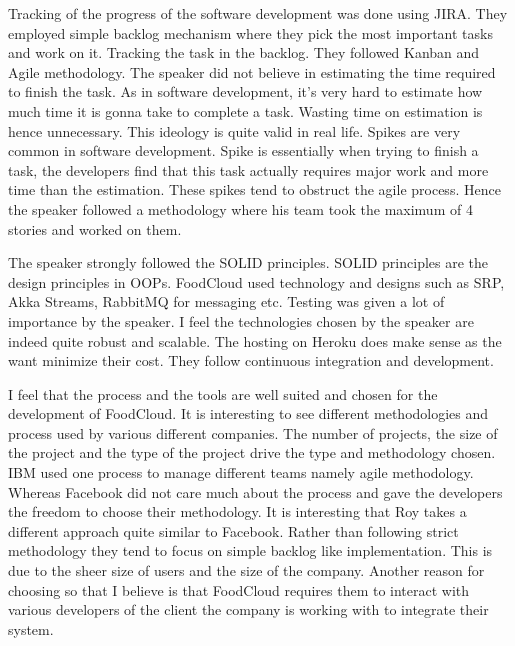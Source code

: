 \documentclass[10pt]{article}
\begin{document}
Tracking of the progress of the software development was done using JIRA. They employed simple backlog mechanism where they pick the most important tasks and work on it. Tracking the task in the backlog. They followed Kanban and Agile methodology. The speaker did not believe in estimating the time required to finish the task. As in software development, it's very hard to estimate how much time it is gonna take to complete a task. Wasting time on estimation is hence unnecessary. This ideology is quite valid in real life. Spikes are very common in software development. Spike is essentially when trying to finish a task, the developers find that this task actually requires major work and more time than the estimation. These spikes tend to obstruct the agile process. Hence the speaker followed a methodology where his team took the maximum of 4 stories and worked on them. 

The speaker strongly followed the SOLID principles. SOLID principles are the design principles in OOPs. FoodCloud used technology and designs such as SRP, Akka Streams, RabbitMQ for messaging etc. Testing was given a lot of importance by the speaker. I feel the technologies chosen by the speaker are indeed quite robust and scalable. The hosting on Heroku does make sense as the want minimize their cost. They follow continuous integration and development. 

I feel that the process and the tools are well suited and chosen for the development of FoodCloud. It is interesting to see different methodologies and process used by various different companies. The number of projects, the size of the project and the type of the project drive the type and methodology chosen. IBM used one process to manage different teams namely agile methodology. Whereas Facebook did not care much about the process and gave the developers the freedom to choose their methodology. It is interesting that Roy takes a different approach quite similar to Facebook. Rather than following strict methodology they tend to focus on simple backlog like implementation. This is due to the sheer size of users and the size of the company. Another reason for choosing so that I believe is that FoodCloud requires them to interact with various developers of the client the company is working with to integrate their system.
\end{document}
